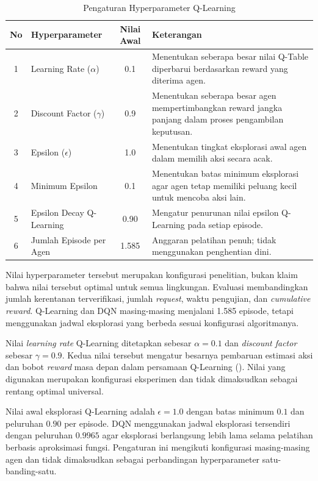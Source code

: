 \begin{table}[H]
\centering
\begin{tabular}{|c|l|c|p{7cm}|}
\hline
\textbf{No} & \textbf{Hyperparameter} & \textbf{Nilai Awal} & \textbf{Keterangan} \\ \hline

1 & Learning Rate ($\alpha$) & 0.1 & Menentukan seberapa besar nilai Q-Table diperbarui berdasarkan reward yang diterima agen. \\ \hline
2 & Discount Factor ($\gamma$) & 0.9 & Menentukan seberapa besar agen mempertimbangkan reward jangka panjang dalam proses pengambilan keputusan. \\ \hline
3 & Epsilon ($\epsilon$) & 1.0 & Menentukan tingkat eksplorasi awal agen dalam memilih aksi secara acak. \\ \hline
4 & Minimum Epsilon & 0.1 & Menentukan batas minimum eksplorasi agar agen tetap memiliki peluang kecil untuk mencoba aksi lain. \\ \hline
5 & Epsilon Decay Q-Learning & 0.90 & Mengatur penurunan nilai epsilon Q-Learning pada setiap episode. \\ \hline
6 & Jumlah Episode per Agen & 1.585 & Anggaran pelatihan penuh; tidak menggunakan penghentian dini. \\ \hline

\end{tabular}
\caption{Pengaturan Hyperparameter Q-Learning}
\label{tab:hyperparameter_qlearning}
\end{table}

Nilai hyperparameter tersebut merupakan konfigurasi penelitian, bukan klaim bahwa nilai tersebut optimal untuk semua lingkungan. Evaluasi membandingkan jumlah kerentanan terverifikasi, jumlah \textit{request}, waktu pengujian, dan \textit{cumulative reward}. Q-Learning dan DQN masing-masing menjalani 1.585 episode, tetapi menggunakan jadwal eksplorasi yang berbeda sesuai konfigurasi algoritmanya.

Nilai \textit{learning rate} Q-Learning ditetapkan sebesar $\alpha = 0.1$ dan \textit{discount factor} sebesar $\gamma = 0.9$. Kedua nilai tersebut mengatur besarnya pembaruan estimasi aksi dan bobot \textit{reward} masa depan dalam persamaan Q-Learning (\cite{watkins1992qlearning,sutton2018}). Nilai yang digunakan merupakan konfigurasi eksperimen dan tidak dimaksudkan sebagai rentang optimal universal.

Nilai awal eksplorasi Q-Learning adalah $\epsilon = 1.0$ dengan batas minimum $0.1$ dan peluruhan $0.90$ per episode. DQN menggunakan jadwal eksplorasi tersendiri dengan peluruhan $0.9965$ agar eksplorasi berlangsung lebih lama selama pelatihan berbasis aproksimasi fungsi. Pengaturan ini mengikuti konfigurasi masing-masing agen dan tidak dimaksudkan sebagai perbandingan hyperparameter satu-banding-satu.

